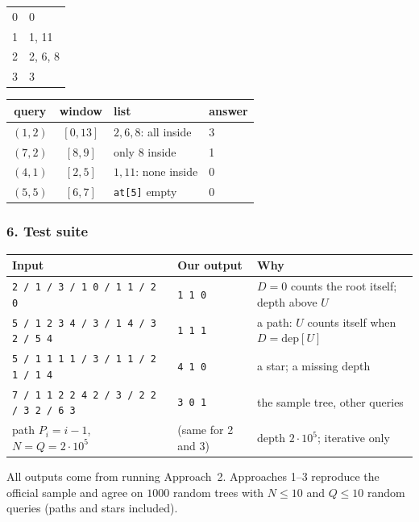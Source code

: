 \begin{tracebox}
\begin{center}
\begin{tabular}{@{}ll@{}}
\midrule
0 & 0 \\
1 & 1, 11 \\
2 & 2, 6, 8 \\
3 & 3 \\
\bottomrule
\end{tabular}
\end{center}
\begin{center}\small
\begin{tabular}{@{}ccll@{}}
\toprule
\textbf{query} & \textbf{window} & \textbf{list} & \textbf{answer} \\
\midrule
$(1,2)$ & $[0, 13]$ & $2, 6, 8$: all inside & 3 \\
$(7,2)$ & $[8, 9]$ & only 8 inside & 1 \\
$(4,1)$ & $[2, 5]$ & $1, 11$: none inside & 0 \\
$(5,5)$ & $[6, 7]$ & \texttt{at[5]} empty & 0 \\
\bottomrule
\end{tabular}
\end{center}
\end{tracebox}

\subsubsection*{6. Test suite}

\begin{testbox}
\centering\small
\begin{tabular}{@{}p{6.4cm}lp{5cm}@{}}
\toprule
\textbf{Input} & \textbf{Our output} & \textbf{Why} \\
\midrule
\texttt{2 / 1 / 3 / 1 0 / 1 1 / 2 0} & \texttt{1 1 0} & $D = 0$ counts the root itself; depth above $U$ \\
\texttt{5 / 1 2 3 4 / 3 / 1 4 / 3 2 / 5 4} & \texttt{1 1 1} & a path: $U$ counts itself when $D = \mathrm{dep}[U]$ \\
\texttt{5 / 1 1 1 1 / 3 / 1 1 / 2 1 / 1 4} & \texttt{4 1 0} & a star; a missing depth \\
\texttt{7 / 1 1 2 2 4 2 / 3 / 2 2 / 3 2 / 6 3} & \texttt{3 0 1} & the sample tree, other queries \\
path $P_i = i-1$, $N = Q = 2\cdot10^5$ & (same for 2 and 3) & depth $2\cdot10^5$; iterative only \\
\bottomrule
\end{tabular}
\end{testbox}
All outputs come from running Approach~2. Approaches 1--3 reproduce the official sample and agree on $1000$ random trees with $N \le 10$ and $Q \le 10$ random queries (paths and stars included).

